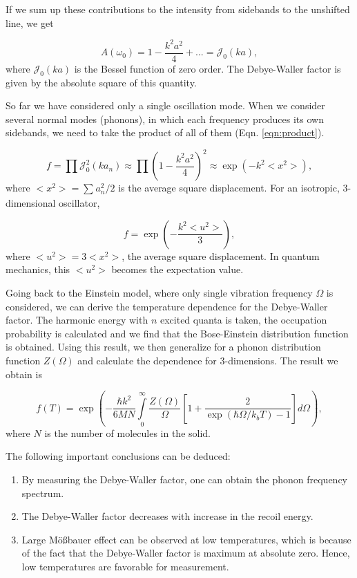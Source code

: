 \documentclass[a4paper]{report}
\numberwithin{equation}{section}
\begin{document}
If we sum up these contributions to the intensity from sidebands to the unshifted line, we get

\begin{equation}
		A(\omega_{0}) = 1 - \frac{k^2 a^2}{4} + ... = \mathcal{J}_{0} (ka),
\end{equation}
where $\mathcal{J}_{0} (ka)$ is the Bessel function of zero order. The Debye-Waller factor is given by the absolute square of this quantity. 

So far we have considered only a single oscillation mode. When we consider several normal modes (phonons), in which each frequency produces its own sidebands, we need to take the product of all of them (Eqn. \ref{eqn:product}). 

\begin{equation} \label{eqn:product}
		f = \prod \mathcal{J}_{0}^2(ka_{n}) \approx \prod \left( 1 - \frac{k^2 a^2}{4}\right)^2 \approx \exp \left(- k^2 < x^2 > \right),   
\end{equation}
where $< x^2 > = \sum_{}^{} a_{n}^2 / 2$ is the average square displacement. For an isotropic, 3-dimensional oscillator, 

\begin{equation}
		f = \exp \left( - \frac{k^2 < u^2 >}{3} \right),
\end{equation}
where $< u^2 > = 3 < x^2 >$, the average square displacement. In quantum mechanics, this $< u^2 >$ becomes the expectation value.

Going back to the Einstein model, where only single vibration frequency $\Omega $ is considered, we can derive the temperature dependence for the Debye-Waller factor. The harmonic energy with $n$ excited quanta is taken, the occupation probability is calculated and we find that the Bose-Einstein distribution function is obtained. Using this result, we then generalize for a phonon distribution function $Z(\Omega )$ and calculate the dependence for 3-dimensions. The result we obtain is

\begin{equation}
		f(T) = \exp \left( - \frac{\hbar k^2}{6 M N } \int\limits_{0}^{\infty} \frac{Z(\Omega )}{\Omega } \left[ 1 + \frac{2}{\exp(\hbar \Omega / k_{b} T) - 1 } \right] d \Omega \right),
\end{equation}
where $N$ is the number of molecules in the solid. 

The following important conclusions can be deduced: 
\begin{enumerate}
		\item By measuring the Debye-Waller factor, one can obtain the phonon frequency spectrum.
		\item The Debye-Waller factor decreases with increase in the recoil energy.
		\item Large M\"o{\ss}bauer effect can be observed at low temperatures, which is because of the fact that the Debye-Waller factor is maximum at absolute zero. Hence, low temperatures are favorable for measurement.
\end{enumerate}
\end{document}
